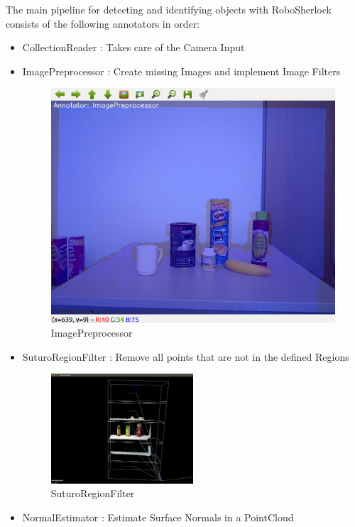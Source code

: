 \documentclass[main.tex]{subfiles}
\begin{document}
The main pipeline for detecting and identifying objects with RoboSherlock consists of the following annotators in order:  
\begin{itemize}
	\item CollectionReader : Takes care of the Camera  Input
	\item ImagePreprocessor : Create missing Images and implement Image Filters  
		\begin{figure}[H]
   			 \centering
    			\includegraphics[width=0.5\linewidth]{pictures/2d/ImagePreProcessor.png}
   			 \caption{ImagePreprocessor}
  		\end{figure}
	\item SuturoRegionFilter : Remove all points that are not in the defined Regions 
		\begin{figure}[H]
   			 \centering
    			\includegraphics[width=0.5\textwidth]{pictures/pcl/RegionFilter.png}
   			 \caption{SuturoRegionFilter}
  		\end{figure}
	\item NormalEstimator : Estimate Surface Normals in a PointCloud 
		\begin{figure}[H]
   			 \centering
\end{figure}
\end{itemize}
\end{document}
